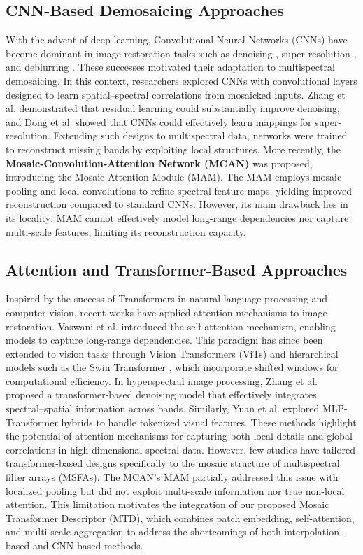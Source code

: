 \documentclass[conference]{IEEEtran}
\begin{document}
\subsection{CNN-Based Demosaicing Approaches}
With the advent of deep learning, Convolutional Neural Networks (CNNs) have become dominant in image restoration tasks such as denoising \cite{Zhang2017}, super-resolution \cite{Dong2016}, and deblurring \cite{Tao2018ScaleRecurrent}. These successes motivated their adaptation to multispectral demosaicing.
In this context, researchers explored CNNs with convolutional layers designed to learn spatial–spectral correlations from mosaicked inputs. Zhang et al. \cite{Zhang2017} demonstrated that residual learning could substantially improve denoising, and Dong et al. \cite{Dong2016} showed that CNNs could effectively learn mappings for super-resolution. Extending such designs to multispectral data, networks were trained to reconstruct missing bands by exploiting local structures.
More recently, the \textbf{ Mosaic-Convolution-Attention Network (MCAN)} \cite{Feng2021} was proposed, introducing the Mosaic Attention Module (MAM). The MAM employs mosaic pooling and local convolutions to refine spectral feature maps, yielding improved reconstruction compared to standard CNNs. However, its main drawback lies in its locality: MAM cannot effectively model long-range dependencies nor capture multi-scale features, limiting its reconstruction capacity.
\subsection{Attention and Transformer-Based Approaches}

Inspired by the success of Transformers in natural language processing and computer vision, recent works have applied attention mechanisms to image restoration. Vaswani et al. \cite{Vaswani2023} introduced the self-attention mechanism, enabling models to capture long-range dependencies. This paradigm has since been extended to vision tasks through Vision Transformers (ViTs) and hierarchical models such as the Swin Transformer \cite{Liu2021}, which incorporate shifted windows for computational efficiency.
In hyperspectral image processing, Zhang et al. \cite{Fu2024} proposed a transformer-based denoising model that effectively integrates spectral–spatial information across bands. Similarly, Yuan et al. \cite{Wang2023} explored MLP-Transformer hybrids to handle tokenized visual features. These methods highlight the potential of attention mechanisms for capturing both local details and global correlations in high-dimensional spectral data.
However, few studies have tailored transformer-based designs specifically to the mosaic structure of multispectral filter arrays (MSFAs). The MCAN's MAM \cite{Feng2021} partially addressed this issue with localized pooling but did not exploit multi-scale information nor true non-local attention. This limitation motivates the integration of our proposed Mosaic Transformer Descriptor (MTD), which combines patch embedding, self-attention, and multi-scale aggregation to address the shortcomings of both interpolation-based and CNN-based methods.\\
\end{document}
